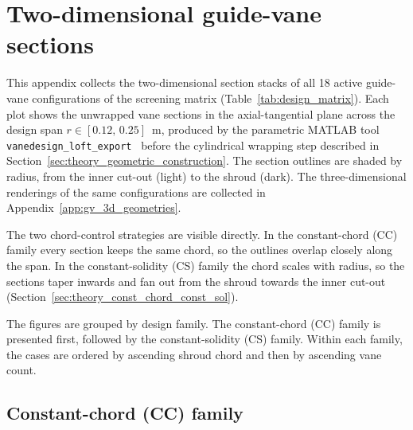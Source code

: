\chapter{Two-dimensional guide-vane sections}
\label{app:gv_2d_sections}
\fancyhead{}

This appendix collects the two-dimensional section stacks of all 18 active guide-vane configurations of the screening matrix (Table~\ref{tab:design_matrix}). Each plot shows the unwrapped vane sections in the axial-tangential plane across the design span $r \in [0.12,\,0.25]$~m, produced by the parametric MATLAB tool \texttt{vanedesign\_loft\_export}~\cite{Leonsen2025} before the cylindrical wrapping step described in Section~\ref{sec:theory_geometric_construction}. The section outlines are shaded by radius, from the inner cut-out (light) to the shroud (dark). The three-dimensional renderings of the same configurations are collected in Appendix~\ref{app:gv_3d_geometries}.

The two chord-control strategies are visible directly. In the constant-chord (CC) family every section keeps the same chord, so the outlines overlap closely along the span. In the constant-solidity (CS) family the chord scales with radius, so the sections taper inwards and fan out from the shroud towards the inner cut-out (Section~\ref{sec:theory_const_chord_const_sol}).

The figures are grouped by design family. The constant-chord (CC) family is presented first, followed by the constant-solidity (CS) family. Within each family, the cases are ordered by ascending shroud chord and then by ascending vane count.

\section*{Constant-chord (CC) family}

